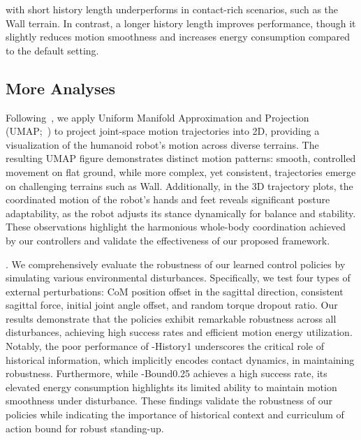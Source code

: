  \ours with short history length underperforms in contact-rich scenarios, such as the Wall terrain. In contrast, a longer history length improves performance, though it slightly reduces motion smoothness and increases energy consumption compared to the default setting.

\subsection{More Analyses}  
 Following~\cite{haarnoja2024learning}, we apply Uniform Manifold Approximation and Projection (UMAP;~\cite{mcinnes2018umap}) to project joint-space motion trajectories into 2D, providing a visualization of the humanoid robot’s motion across diverse terrains. The resulting UMAP figure demonstrates distinct motion patterns: smooth, controlled movement on flat ground, while more complex, yet consistent, trajectories emerge on challenging terrains such as Wall. Additionally, in the 3D trajectory plots, the coordinated motion of the robot's hands and feet reveals significant posture adaptability, as the robot adjusts its stance dynamically for balance and stability. These observations highlight the harmonious whole-body coordination achieved by our controllers and validate the effectiveness of our proposed framework.

. We comprehensively evaluate the robustness of our learned control policies by simulating various environmental disturbances. Specifically, we test four types of external perturbations: CoM position offset in the sagittal direction, consistent sagittal force,  initial joint angle offset, and random torque dropout ratio. Our results demonstrate that the policies exhibit remarkable robustness across all disturbances, achieving high success rates and efficient motion energy utilization. Notably, the poor performance of \ours-History1 underscores the critical role of historical information, which implicitly encodes contact dynamics, in maintaining robustness. Furthermore, while \ours-Bound0.25 achieves a high success rate, its elevated energy consumption highlights its limited ability to maintain motion smoothness under disturbance. These findings validate the robustness of our policies while indicating the importance of historical context and curriculum of action bound for robust standing-up.


